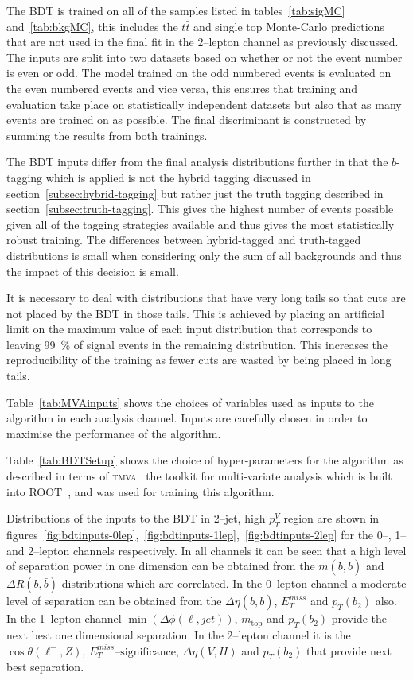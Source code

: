 The BDT is trained on all of the samples listed in tables~\ref{tab:sigMC}
and~\ref{tab:bkgMC}, this includes the $t\bar{t}$ and single top Monte-Carlo
predictions that are not used in the final fit in the 2--lepton channel as
previously discussed. The inputs are split into two datasets based on whether or
not the event number is even or odd. The model trained on the odd numbered
events is evaluated on the even numbered events and vice versa, this ensures
that training and evaluation take place on statistically independent datasets
but also that as many events are trained on as possible. The final discriminant
is constructed by summing the results from both trainings.

The BDT inputs differ from the final analysis distributions further in that the
$b$-tagging which is applied is not the hybrid tagging discussed in
section~\ref{subsec:hybrid-tagging} but rather just the truth tagging described
in section~\ref{subsec:truth-tagging}. This gives the highest number of events
possible given all of the tagging strategies available and thus gives the most
statistically robust training. The differences between hybrid-tagged and
truth-tagged distributions is small when considering only the sum of all
backgrounds and thus the impact of this decision is small.

It is necessary to deal with distributions that have very long tails so that
cuts are not placed by the BDT in those tails. This is achieved by placing an
artificial limit on the maximum value of each input distribution that
corresponds to leaving 99~\% of signal events in the remaining distribution.
This increases the reproducibility of the training as fewer cuts are wasted by
being placed in long tails.

Table~\ref{tab:MVAinputs} shows the choices of variables used as inputs to the
algorithm in each analysis channel. Inputs are carefully chosen in order to
maximise the performance of the algorithm.

Table~\ref{tab:BDTSetup} shows the choice of hyper-parameters for the algorithm
as described in terms of \textsc{tmva}~\cite{TMVA} the toolkit for multi-variate
analysis which is built into \textsc{ROOT}~\cite{ROOT}, and was used for
training this algorithm.


Distributions of the inputs to the BDT in 2--jet, high $p_T^V$ region are shown
in
figures~\ref{fig:bdtinputs-0lep},~\ref{fig:bdtinputs-1lep},~\ref{fig:bdtinputs-2lep}
for the 0--, 1-- and 2--lepton channels respectively. In all channels it can be
seen that a high level of separation power in one dimension can be obtained from
the $m(b,\bar{b})$ and $\Delta R (b, \bar{b})$ distributions which are
correlated. In the 0--lepton channel a moderate level of separation can be
obtained from the $\Delta \eta(b, \bar{b})$, $E_T^{miss}$ and $p_T(b_2)$ also.
In the 1--lepton channel $\min(\Delta\phi(\ell,jet))$, $m_{\text{top}}$ and
$p_T(b_2)$ provide the next best one dimensional separation. In the 2--lepton
channel it is the $\cos{\theta(\ell^-,Z)}$, $E_T^{miss}\text{--significance}$,
$\Delta \eta(V, H)$ and $p_T(b_2)$ that provide next best separation.


